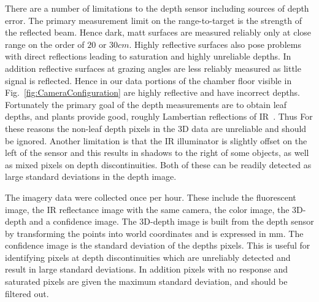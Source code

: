 There are a number of limitations to the depth sensor including sources of depth error. The primary measurement limit on the range-to-target is the strength of the reflected beam. Hence dark, matt surfaces are measured reliably only at close range on the order of $20$ or $30cm$.  Highly reflective surfaces also pose problems with direct reflections leading to saturation and highly unreliable depths.  In addition reflective surfaces at grazing angles are less reliably measured as little signal is reflected.  Hence in our data portions of the chamber floor visible in Fig.~\ref{fig:CameraConfiguration} are highly reflective and have incorrect depths.  Fortunately the primary goal of the depth measurements are to obtain leaf depths, and plants provide good, roughly Lambertian reflections of IR~\cite{Chelle2006219}.  Thus For these reasons the non-leaf depth pixels in the 3D data are unreliable and should be ignored.  Another limitation is that the IR illuminator is slightly offset on the left of the sensor and this results in shadows to the right of some objects, as well as mixed pixels on depth discontinuities.  Both of these can be readily detected as large standard deviations in the depth image.

The imagery data were collected once per hour. %
These include the fluorescent image, the IR reflectance image with the same camera, the color image, the 3D-depth and a confidence image.  The 3D-depth image is built from the depth sensor by transforming the points into world coordinates and is expressed in mm.  The confidence image is the standard deviation of the depths pixels.  This is useful for identifying pixels at depth discontinuities which are unreliably detected and result in large standard deviations.  In addition pixels with no response and saturated pixels are given the maximum standard deviation, and should be filtered out.
